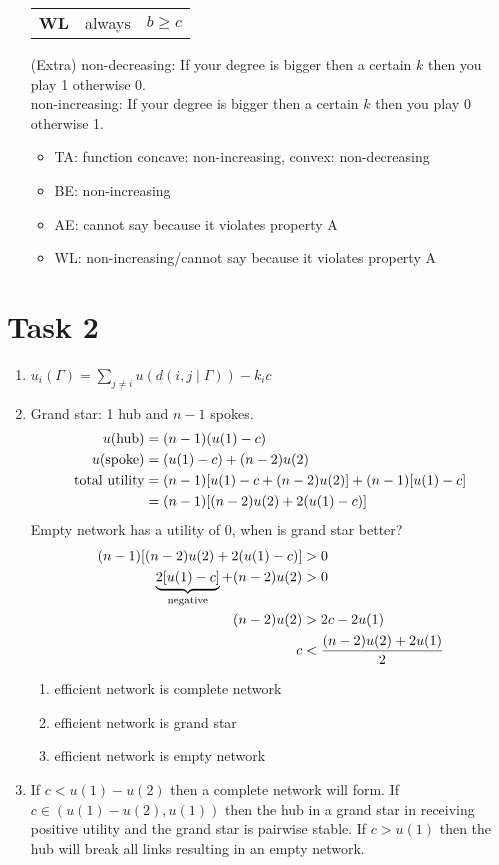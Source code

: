 \documentclass{article}
\begin{document}
\begin{enumerate}[label=(\alph*)]
\begin{center}
\begin{tabular}{c|C{5cm}|C{5cm}}
				\hline
				\textbf{WL} & always & $b\ge c$
			\end{tabular}
		\end{center}
		\item[(Extra)] non-decreasing: If your degree is bigger then a certain $k$ then you play 1 otherwise 0. \\
		non-increasing: If your degree is bigger then a certain $k$ then you play 0 otherwise 1.
		\begin{itemize}
			\item TA: function concave: non-increasing, convex: non-decreasing
			\item BE: non-increasing
			\item AE: cannot say because it violates property A
			\item WL: non-increasing/cannot say because it violates property A
		\end{itemize}
	\end{enumerate}

	\section*{Task 2}
	\begin{enumerate}[label=(\alph*)]
		\item $u_i(\Gamma) = \sum_{j\neq i} u(d(i,j\mid \Gamma)) - k_ic$
		\item Grand star: 1 hub and $n-1$ spokes. 
		\begin{align}
			u(\text{hub}) &= (n-1)(u(1) - c) \notag \\
			u(\text{spoke}) &= (u(1) - c) + (n-2)u(2) \notag \\
			\text{total utility} &= (n-1)[u(1) - c + (n-2)u(2)] + (n-1)[u(1) - c] \notag \\
			&= (n-1)[(n-2)u(2) + 2(u(1) - c)] \notag
		\end{align}
		Empty network has a utility of 0, when is grand star better?
		\begin{align}
			(n-1)[(n-2)u(2) + 2(u(1) - c)] &> 0 \notag \\
			\underbrace{2[u(1) - c]}_{\text{negative}} + (n-2)u(2) &> 0 \notag \\
			(n-2)u(2) &> 2c - 2u(1) \notag \\
			c&< \frac{(n-2)u(2) + 2u(1)}{2} \notag
		\end{align}
		\begin{enumerate}[label=(\roman*)]
			\item efficient network is complete network
			\item efficient network is grand star
			\item efficient network is empty network
		\end{enumerate}
		\item If $c<u(1) - u(2)$ then a complete network will form. If $c\in (u(1) - u(2), u(1))$ then the hub in a grand star in receiving positive utility and the grand star is pairwise stable. If $c>u(1)$ then the hub will break all links resulting in an empty network.
	\end{enumerate}
\end{document}
